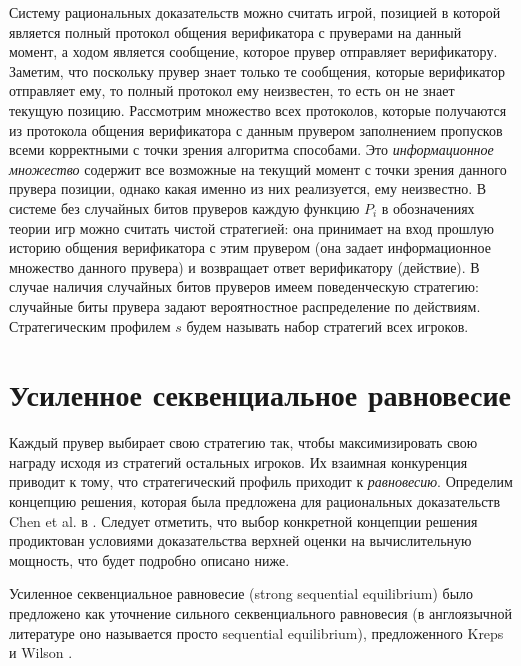 \documentclass[14pt, a4paper]{extreport}
\begin{document}
        Систему рациональных доказательств можно считать игрой, позицией в которой является полный протокол общения верификатора с пруверами на данный момент, а ходом является сообщение, которое прувер отправляет верификатору. Заметим, что поскольку прувер знает только те сообщения, которые верификатор отправляет ему, то полный протокол ему неизвестен, то есть он не знает текущую позицию.
        Рассмотрим множество всех протоколов, которые получаются из протокола общения верификатора с данным прувером заполнением пропусков всеми корректными с точки зрения алгоритма способами.
        Это \textit{информационное множество} содержит все возможные на текущий момент с точки зрения данного прувера позиции, однако какая именно из них реализуется, ему неизвестно.
        В системе без случайных битов пруверов каждую функцию $P_i$ в обозначениях теории игр можно считать чистой стратегией: она принимает на вход прошлую историю общения верификатора с этим прувером (она задает информационное множество данного прувера) и возвращает ответ верификатору (действие). В случае наличия случайных битов пруверов имеем поведенческую стратегию: случайные биты прувера задают вероятностное распределение по действиям. Стратегическим профилем $s$ будем называть набор стратегий всех игроков.

        \section{Усиленное секвенциальное равновесие}

        Каждый прувер выбирает свою стратегию так, чтобы максимизировать свою награду исходя из стратегий остальных игроков.
        Их взаимная конкуренция приводит к тому, что стратегический профиль приходит к \textit{равновесию}. Определим концепцию решения, которая была предложена для рациональных доказательств Chen et al. в \cite{chen2017noncoop}.
        Следует отметить, что выбор конкретной концепции решения продиктован условиями доказательства верхней оценки на вычислительную мощность, что будет подробно описано ниже.

        Усиленное секвенциальное равновесие (strong sequential equilibrium) было предложено как уточнение сильного секвенциального равновесия (в англоязычной литературе оно называется просто sequential equilibrium), предложенного Kreps и Wilson \cite{kreps1982sequential}.
\end{document}
